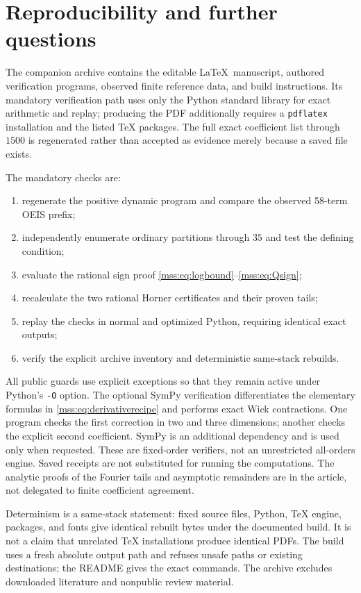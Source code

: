 \documentclass[11pt,letterpaper]{article}
\numberwithin{equation}{section}
\theoremstyle{definition}\newtheorem{definition}[theorem]{Definition}
\theoremstyle{remark}\newtheorem{remark}[theorem]{Remark}
\begin{document}
\section{Reproducibility and further questions}\label{mss:sec:reproduce}
The companion archive contains the editable \LaTeX\ manuscript, authored verification programs, observed finite reference data, and build instructions. Its mandatory verification path uses only the Python standard library for exact arithmetic and replay; producing the PDF additionally requires a \texttt{pdflatex} installation and the listed TeX packages. The full exact coefficient list through $1500$ is regenerated rather than accepted as evidence merely because a saved file exists.

The mandatory checks are:
\begin{enumerate}[leftmargin=*,itemsep=2pt]
\item regenerate the positive dynamic program and compare the observed 58-term OEIS prefix;
\item independently enumerate ordinary partitions through $35$ and test the defining condition;
\item evaluate the rational sign proof \eqref{mss:eq:logbound}--\eqref{mss:eq:Qsign};
\item recalculate the two rational Horner certificates and their proven tails;
\item replay the checks in normal and optimized Python, requiring identical exact outputs;
\item verify the explicit archive inventory and deterministic same-stack rebuilds.
\end{enumerate}
All public guards use explicit exceptions so that they remain active under Python's \texttt{-O} option. The optional SymPy verification differentiates the elementary formulas in \eqref{mss:eq:derivativerecipe} and performs exact Wick contractions. One program checks the first correction in two and three dimensions; another checks the explicit second coefficient. SymPy is an additional dependency and is used only when requested. These are fixed-order verifiers, not an unrestricted all-orders engine. Saved receipts are not substituted for running the computations. The analytic proofs of the Fourier tails and asymptotic remainders are in the article, not delegated to finite coefficient agreement.

Determinism is a same-stack statement: fixed source files, Python, TeX engine, packages, and fonts give identical rebuilt bytes under the documented build. It is not a claim that unrelated TeX installations produce identical PDFs. The build uses a fresh absolute output path and refuses unsafe paths or existing destinations; the README gives the exact commands. The archive excludes downloaded literature and nonpublic review material.
\end{document}
